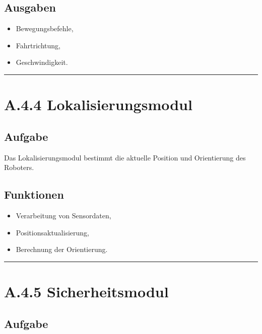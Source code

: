 \documentclass[
]{article}
\providecommand{\tightlist}{%
  \setlength{\itemsep}{0pt}\setlength{\parskip}{0pt}}
\begin{document}
\subsection{Ausgaben}\label{ausgaben}

\begin{itemize}
\tightlist
\item
  Bewegungsbefehle,
\item
  Fahrtrichtung,
\item
  Geschwindigkeit.
\end{itemize}

\begin{center}\rule{0.5\linewidth}{0.5pt}\end{center}

\section{A.4.4 Lokalisierungsmodul}\label{a.4.4-lokalisierungsmodul}

\subsection{Aufgabe}\label{aufgabe-8}

Das Lokalisierungsmodul bestimmt die aktuelle Position und Orientierung
des Roboters.

\subsection{Funktionen}\label{funktionen-2}

\begin{itemize}
\tightlist
\item
  Verarbeitung von Sensordaten,
\item
  Positionsaktualisierung,
\item
  Berechnung der Orientierung.
\end{itemize}

\begin{center}\rule{0.5\linewidth}{0.5pt}\end{center}

\section{A.4.5 Sicherheitsmodul}\label{a.4.5-sicherheitsmodul}

\subsection{Aufgabe}\label{aufgabe-9}
\end{document}
